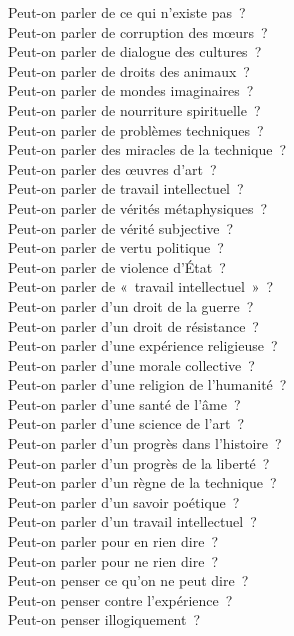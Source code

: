 \documentclass[a4paper,12pt]{article}
\begin{document}
Peut-on parler de ce qui n'existe pas ? \\
Peut-on parler de corruption des mœurs ? \\
Peut-on parler de dialogue des cultures ? \\
Peut-on parler de droits des animaux ? \\
Peut-on parler de mondes imaginaires ? \\
Peut-on parler de nourriture spirituelle ? \\
Peut-on parler de problèmes techniques ? \\
Peut-on parler des miracles de la technique ? \\
Peut-on parler des œuvres d'art ? \\
Peut-on parler de travail intellectuel ? \\
Peut-on parler de vérités métaphysiques ? \\
Peut-on parler de vérité subjective ? \\
Peut-on parler de vertu politique ? \\
Peut-on parler de violence d'État ? \\
Peut-on parler de « travail intellectuel » ? \\
Peut-on parler d'un droit de la guerre ? \\
Peut-on parler d'un droit de résistance ? \\
Peut-on parler d'une expérience religieuse ? \\
Peut-on parler d'une morale collective ? \\
Peut-on parler d'une religion de l'humanité ? \\
Peut-on parler d'une santé de l'âme ? \\
Peut-on parler d'une science de l'art ? \\
Peut-on parler d'un progrès dans l'histoire ? \\
Peut-on parler d'un progrès de la liberté ? \\
Peut-on parler d'un règne de la technique ? \\
Peut-on parler d'un savoir poétique ? \\
Peut-on parler d'un travail intellectuel ? \\
Peut-on parler pour en rien dire ? \\
Peut-on parler pour ne rien dire ? \\
Peut-on penser ce qu'on ne peut dire ? \\
Peut-on penser contre l'expérience ? \\
Peut-on penser illogiquement ? \\
\end{document}
